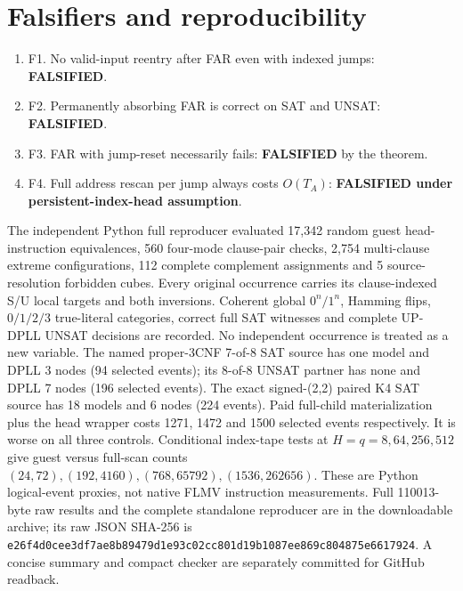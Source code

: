 \documentclass[10pt]{article}
\begin{document}
\section{Falsifiers and reproducibility}
\begin{enumerate}
\item[] F1. No valid-input reentry after FAR even with indexed jumps: \textbf{FALSIFIED}.
\item[] F2. Permanently absorbing FAR is correct on SAT and UNSAT: \textbf{FALSIFIED}.
\item[] F3. FAR with jump-reset necessarily fails: \textbf{FALSIFIED} by the theorem.
\item[] F4. Full address rescan per jump always costs $O(T_A)$: \textbf{FALSIFIED under persistent-index-head assumption}.
\end{enumerate}
The independent Python full reproducer evaluated 17,342 random guest head-instruction equivalences, 560 four-mode clause-pair checks, 2,754 multi-clause extreme configurations, 112 complete complement assignments and 5 source-resolution forbidden cubes. Every original occurrence carries its clause-indexed S/U local targets and both inversions. Coherent global $0^n/1^n$, Hamming flips, $0/1/2/3$ true-literal categories, correct full SAT witnesses and complete UP-DPLL UNSAT decisions are recorded. No independent occurrence is treated as a new variable.
The named proper-3CNF 7-of-8 SAT source has one model and DPLL 3 nodes (94 selected events); its 8-of-8 UNSAT partner has none and DPLL 7 nodes (196 selected events). The exact signed-(2,2) paired K4 SAT source has 18 models and 6 nodes (224 events). Paid full-child materialization plus the head wrapper costs 1271, 1472 and 1500 selected events respectively. It is worse on all three controls. Conditional index-tape tests at $H=q=8,64,256,512$ give guest versus full-scan counts $(24,72),(192,4160),(768,65792),(1536,262656)$. These are Python logical-event proxies, not native FLMV instruction measurements. Full 110013-byte raw results and the complete standalone reproducer are in the downloadable archive; its raw JSON SHA-256 is \texttt{e26f4d0cee3df7ae8b89479d1e93c02cc801d19b1087ee869c804875e6617924}. A concise summary and compact checker are separately committed for GitHub readback.
\end{document}
